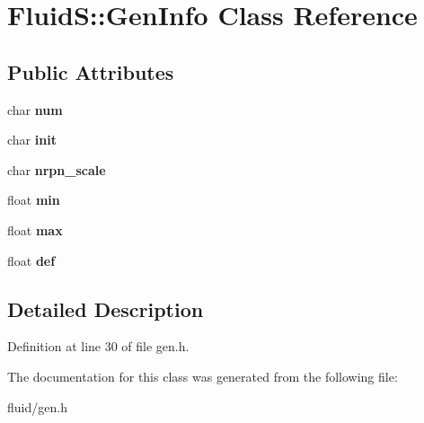 \hypertarget{class_fluid_s_1_1_gen_info}{}\section{FluidS\+:\+:Gen\+Info Class Reference}
\label{class_fluid_s_1_1_gen_info}
\subsection*{Public Attributes}
\begin{DoxyCompactItemize}
\item 
\mbox{\label{class_fluid_s_1_1_gen_info_a5b043f3880015d04cdb3d56e9b442b0f}} 
char {\bfseries num}
\item 
\mbox{\label{class_fluid_s_1_1_gen_info_a88f7eef9d70168d4cf43c2c3ee8dc11b}} 
char {\bfseries init}
\item 
\mbox{\label{class_fluid_s_1_1_gen_info_a876903fa36619164dd7e2e3b838aa1f0}} 
char {\bfseries nrpn\+\_\+scale}
\item 
\mbox{\label{class_fluid_s_1_1_gen_info_ad550112e36582e6f49dc1a5d40267725}} 
float {\bfseries min}
\item 
\mbox{\label{class_fluid_s_1_1_gen_info_a86950d6204562853ff5832f95c0c1af2}} 
float {\bfseries max}
\item 
\mbox{\label{class_fluid_s_1_1_gen_info_a6b24ca03c9aafb5ca262d77937f53f7c}} 
float {\bfseries def}
\end{DoxyCompactItemize}


\subsection{Detailed Description}


Definition at line 30 of file gen.\+h.



The documentation for this class was generated from the following file\+:\begin{DoxyCompactItemize}
\item 
fluid/gen.\+h\end{DoxyCompactItemize}
